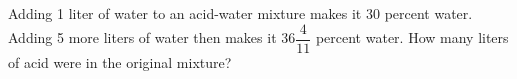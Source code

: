 Adding 1 liter of water to an acid-water mixture makes it 30 percent water. Adding 5 more liters of water then makes it $36\dfrac{4}{11}$ percent water. How many liters of acid were in the original mixture?
